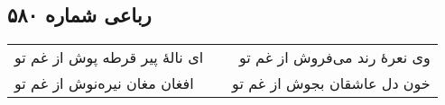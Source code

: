 \begin{center}
\section*{رباعی شماره ۵۸۰}
\label{sec:sh580}
\begin{longtable}{l p{0.5cm} r}
ای نالهٔ پیر قرطه پوش از غم تو
&&
وی نعرهٔ رند می‌فروش از غم تو
\\
افغان مغان نیره‌نوش از غم تو
&&
خون دل عاشقان بجوش از غم تو
\\
\end{longtable}
\end{center}
